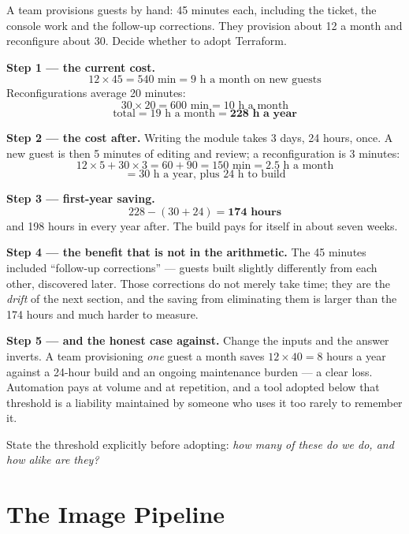 \begin{worked}
A team provisions guests by hand: 45 minutes each, including the ticket, the
console work and the follow-up corrections. They provision about 12 a month and
reconfigure about 30. Decide whether to adopt Terraform.

\smallskip
\textbf{Step 1 --- the current cost.}
\[ 12 \times 45 = 540 \text{ min} = 9 \text{ h a month on new guests} \]
Reconfigurations average 20 minutes:
\[ 30 \times 20 = 600 \text{ min} = 10 \text{ h a month} \]
\[ \text{total} = 19 \text{ h a month} = \mathbf{228 \text{ h a year}} \]

\smallskip
\textbf{Step 2 --- the cost after.} Writing the module takes 3 days, 24 hours,
once. A new guest is then 5 minutes of editing and review; a reconfiguration is
3 minutes:
\[ 12 \times 5 + 30 \times 3 = 60 + 90 = 150 \text{ min} = 2.5
   \text{ h a month} \]
\[ = 30 \text{ h a year, plus } 24 \text{ h to build} \]

\smallskip
\textbf{Step 3 --- first-year saving.}
\[ 228 - (30 + 24) = \mathbf{174 \text{ hours}} \]
and 198 hours in every year after. The build pays for itself in about seven
weeks.

\smallskip
\textbf{Step 4 --- the benefit that is not in the arithmetic.} The 45 minutes
included ``follow-up corrections'' --- guests built slightly differently from
each other, discovered later. Those corrections do not merely take time; they
are the \emph{drift} of the next section, and the saving from eliminating them
is larger than the 174 hours and much harder to measure.

\smallskip
\textbf{Step 5 --- and the honest case against.} Change the inputs and the
answer inverts. A team provisioning \emph{one} guest a month saves
$12 \times 40 = 8$ hours a year against a 24-hour build and an ongoing
maintenance burden --- a clear loss. Automation pays at volume and at
repetition, and a tool adopted below that threshold is a liability maintained
by someone who uses it too rarely to remember it.

\smallskip
State the threshold explicitly before adopting: \emph{how many of these do we
do, and how alike are they?}
\end{worked}

\section{The Image Pipeline}

